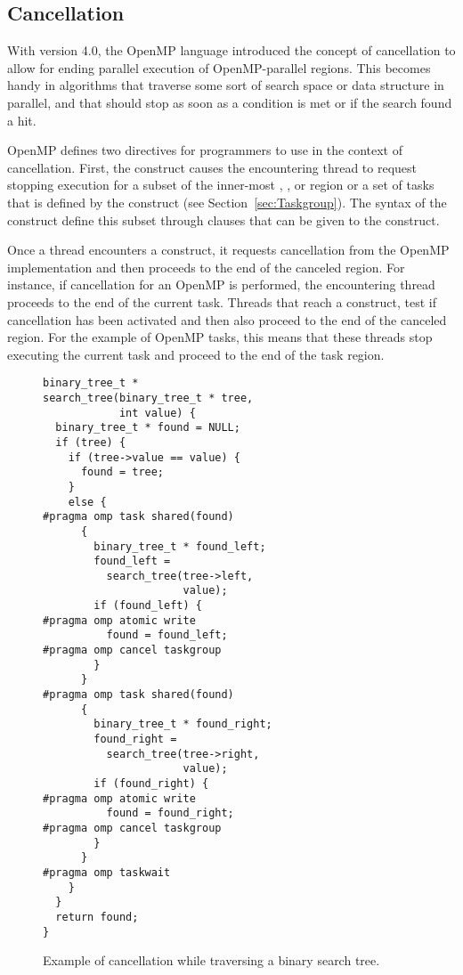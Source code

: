 \subsection{Cancellation}
\label{sec:Cancellation}
With version 4.0, the OpenMP language introduced the concept of cancellation to allow for ending parallel execution of OpenMP-parallel regions.
This becomes handy in algorithms that traverse some sort of search space or data structure in parallel, and that should stop as soon as a condition is met or if the search found a hit.

OpenMP defines two directives for programmers to use in the context of cancellation.
First, the  construct causes the encountering thread to request stopping execution for a subset of the inner-most , ,  or  region or a set of tasks that is defined by the  construct (see Section~\ref{sec:Taskgroup}).
The syntax of the  construct define this subset through clauses that can be given to the construct.

Once a thread encounters a  construct, it requests cancellation from the OpenMP implementation and then proceeds to the end of the canceled region.
For instance, if cancellation for an OpenMP  is performed, the encountering thread proceeds to the end of the current task.
Threads that reach a  construct, test if cancellation has been activated and then also proceed to the end of the canceled region.
For the example of OpenMP tasks, this means that these threads stop executing the current task and proceed to the end of the task region.

\begin{figure}
\begin{verbatim}
binary_tree_t *
search_tree(binary_tree_t * tree,
            int value) {
  binary_tree_t * found = NULL;
  if (tree) {
    if (tree->value == value) {
      found = tree;
    }
    else {
#pragma omp task shared(found)
      {
        binary_tree_t * found_left;
        found_left =
          search_tree(tree->left,
                      value);
        if (found_left) {
#pragma omp atomic write
          found = found_left;
#pragma omp cancel taskgroup
        }
      }
#pragma omp task shared(found)
      {
        binary_tree_t * found_right;
        found_right =
          search_tree(tree->right,
                      value);
        if (found_right) {
#pragma omp atomic write
          found = found_right;
#pragma omp cancel taskgroup
        }
      }
#pragma omp taskwait
    }
  }
  return found;
}
\end{verbatim}
\caption{Example of cancellation while traversing a binary search tree.\label{fig:Cancellation}}
\end{figure}

